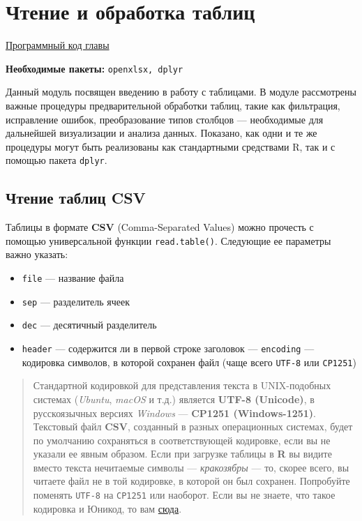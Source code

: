 \documentclass[]{book}
\providecommand{\tightlist}{%
  \setlength{\itemsep}{0pt}\setlength{\parskip}{0pt}}
\begin{document}
\chapter{Чтение и обработка таблиц}\label{tables}

\href{https://github.com/tsamsonov/r-geo-course/blob/master/code/04-TablesDataReading.R}{Программный
код главы}

\textbf{Необходимые пакеты:} \texttt{openxlsx,\ dplyr}

Данный модуль посвящен введению в работу с таблицами. В модуле
рассмотрены важные процедуры предварительной обработки таблиц, такие как
фильтрация, исправление ошибок, преобразование типов столбцов ---
необходимые для дальнейшей визуализации и анализа данных. Показано, как
одни и те же процедуры могут быть реализованы как стандартными
средствами R, так и с помощью пакета \texttt{dplyr}.

\section{Чтение таблиц CSV}\label{reading_csv}

Таблицы в формате \textbf{CSV} (Comma-Separated Values) можно прочесть с
помощью универсальной функции \texttt{read.table()}. Следующие ее
параметры важно указать:

\begin{itemize}
\tightlist
\item
  \texttt{file} --- название файла
\item
  \texttt{sep} --- разделитель ячеек
\item
  \texttt{dec} --- десятичный разделитель
\item
  \texttt{header} --- содержится ли в первой строке заголовок ---
  \texttt{encoding} --- кодировка символов, в которой сохранен файл
  (чаще всего \texttt{UTF-8} или \texttt{CP1251})
\end{itemize}

\begin{quote}
Стандартной кодировкой для представления текста в UNIX-подобных системах
(\emph{Ubuntu}, \emph{macOS} и т.д.) является \textbf{UTF-8 (Unicode)},
в русскоязычных версиях \emph{Windows} --- \textbf{CP1251
(Windows-1251)}. Текстовый файл \textbf{CSV}, созданный в разных
операционных системах, будет по умолчанию сохраняться в соответствующей
кодировке, если вы не указали ее явным образом. Если при загрузке
таблицы в \textbf{R} вы видите вместо текста нечитаемые символы ---
\emph{кракозябры} --- то, скорее всего, вы читаете файл не в той
кодировке, в которой он был сохранен. Попробуйте поменять \texttt{UTF-8}
на \texttt{CP1251} или наоборот. Если вы не знаете, что такое кодировка
и Юникод, то вам
\href{https://ru.wikipedia.org/wiki/Набор_символов}{сюда}.
\end{quote}
\end{document}
